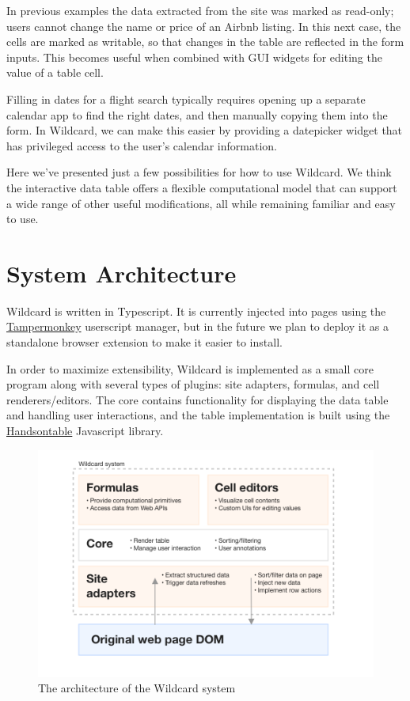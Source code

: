 \documentclass[english,submission]{programming}
\begin{document}
In previous examples the data extracted from the site was marked as
read-only; users cannot change the name or price of an Airbnb listing.
In this next case, the cells are marked as writable, so that changes in
the table are reflected in the form inputs. This becomes useful when
combined with GUI widgets for editing the value of a table cell.

Filling in dates for a flight search typically requires opening up a
separate calendar app to find the right dates, and then manually copying
them into the form. In Wildcard, we can make this easier by providing a
datepicker widget that has privileged access to the user's calendar
information.

Here we've presented just a few possibilities for how to use Wildcard.
We think the interactive data table offers a flexible computational
model that can support a wide range of other useful modifications, all
while remaining familiar and easy to use.

\hypertarget{system-architecture}{%
\section{System Architecture}\label{system-architecture}}

Wildcard is written in Typescript. It is currently injected into pages
using the \href{https://www.tampermonkey.net/}{Tampermonkey} userscript
manager, but in the future we plan to deploy it as a standalone browser
extension to make it easier to install.

In order to maximize extensibility, Wildcard is implemented as a small
core program along with several types of plugins: site adapters,
formulas, and cell renderers/editors. The core contains functionality
for displaying the data table and handling user interactions, and the
table implementation is built using the
\href{https://handsontable.com/}{Handsontable} Javascript library.

\begin{figure}
\centering
\includegraphics{media/architecture-clean.png}
\caption{The architecture of the Wildcard system}
\end{figure}
\end{document}
